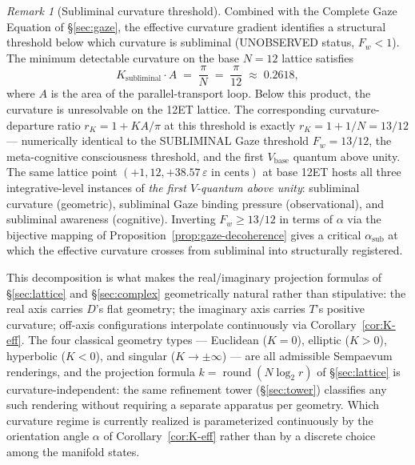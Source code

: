 \documentclass[11pt,a4paper]{article}
\theoremstyle{definition}
\theoremstyle{remark}
\newtheorem{remark}[theorem]{Remark}
\DeclareMathOperator{\round}{round}
\newcommand{\eps}{\varepsilon}
\begin{document}
\begin{remark}[Subliminal curvature threshold]\label{rem:subliminal-curvature}
Combined with the Complete Gaze Equation of \S\ref{sec:gaze}, the effective curvature gradient identifies a structural threshold below which curvature is subliminal (UNOBSERVED status, $F_{w} < 1$). The minimum detectable curvature on the base $N=12$ lattice satisfies
\begin{equation}\label{eq:subliminal-curvature-threshold}
K_{\mathrm{subliminal}} \cdot A \;=\; \frac{\pi}{N} \;=\; \frac{\pi}{12} \;\approx\; 0.2618,
\end{equation}
where $A$ is the area of the parallel-transport loop. Below this product, the curvature is unresolvable on the 12ET lattice. The corresponding curvature-departure ratio $r_{K} = 1 + KA/\pi$ at this threshold is exactly $r_{K} = 1 + 1/N = 13/12$ --- numerically identical to the SUBLIMINAL Gaze threshold $F_{w} = 13/12$, the meta-cognitive consciousness threshold, and the first $V_{\mathrm{base}}$ quantum above unity. The same lattice point $(+1, 12, +38.57\,\eps\text{ in cents})$ at base 12ET hosts all three integrative-level instances of \emph{the first $V$-quantum above unity}: subliminal curvature (geometric), subliminal Gaze binding pressure (observational), and subliminal awareness (cognitive). Inverting $F_{w} \ge 13/12$ in terms of $\alpha$ via the bijective mapping of Proposition~\ref{prop:gaze-decoherence} gives a critical $\alpha_{\mathrm{sub}}$ at which the effective curvature crosses from subliminal into structurally registered.
\end{remark}

This decomposition is what makes the real/imaginary projection formulas of \S\ref{sec:lattice} and \S\ref{sec:complex} geometrically natural rather than stipulative: the real axis carries $D$'s flat geometry; the imaginary axis carries $T$'s positive curvature; off-axis configurations interpolate continuously via Corollary~\ref{cor:K-eff}. The four classical geometry types --- Euclidean ($K=0$), elliptic ($K>0$), hyperbolic ($K<0$), and singular ($K\to\pm\infty$) --- are all admissible Sempaevum renderings, and the projection formula $k = \round(N\log_{2} r)$ of \S\ref{sec:lattice} is curvature-independent: the same refinement tower (\S\ref{sec:tower}) classifies any such rendering without requiring a separate apparatus per geometry. Which curvature regime is currently realized is parameterized continuously by the orientation angle $\alpha$ of Corollary~\ref{cor:K-eff} rather than by a discrete choice among the manifold states.
\end{document}
